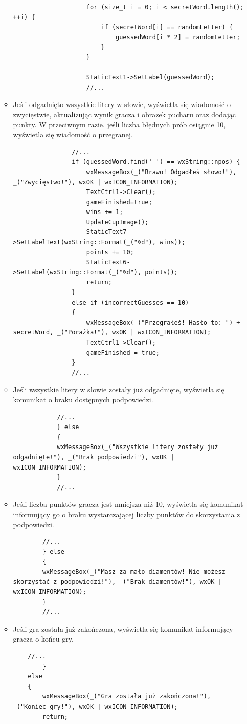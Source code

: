 \documentclass[]{report}
\begin{document}
\begin{itemize}
\begin{itemize}
\begin{lstlisting}
					for (size_t i = 0; i < secretWord.length(); ++i) {
						if (secretWord[i] == randomLetter) {
							guessedWord[i * 2] = randomLetter;
						}
					}
					
					StaticText1->SetLabel(guessedWord);
					//...
			\end{lstlisting}
			\item Jeśli odgadnięto wszystkie litery w słowie, wyświetla się wiadomość o zwycięstwie, aktualizując wynik gracza i obrazek pucharu oraz dodając punkty. W przeciwnym razie, jeśli liczba błędnych prób osiągnie 10, wyświetla się wiadomość o przegranej.
			\begin{lstlisting}
				//...
				if (guessedWord.find('_') == wxString::npos) {
					wxMessageBox(_("Brawo! Odgadłeś słowo!"), _("Zwycięstwo!"), wxOK | wxICON_INFORMATION);
					TextCtrl1->Clear();
					gameFinished=true;
					wins += 1;
					UpdateCupImage();
					StaticText7->SetLabelText(wxString::Format(_("%d"), wins));
					points += 10;
					StaticText6->SetLabel(wxString::Format(_("%d"), points));
					return;
				}
				else if (incorrectGuesses == 10)
				{
					wxMessageBox(_("Przegrałeś! Hasło to: ") + secretWord, _("Porażka!"), wxOK | wxICON_INFORMATION);
					TextCtrl1->Clear();
					gameFinished = true;
				}
				//...
			\end{lstlisting}
			\item Jeśli wszystkie litery w słowie zostały już odgadnięte, wyświetla się komunikat o braku dostępnych podpowiedzi.
			\begin{lstlisting}
			//...
			} else
			{
			wxMessageBox(_("Wszystkie litery zostały już odgadnięte!"), _("Brak podpowiedzi"), wxOK | wxICON_INFORMATION);
			}
			//...
			\end{lstlisting}
			\item Jeśli liczba punktów gracza jest mniejsza niż 10, wyświetla się komunikat informujący go o braku wystarczającej liczby punktów do skorzystania z podpowiedzi.
			\begin{lstlisting}
		//...
		} else
		{
		wxMessageBox(_("Masz za mało diamentów! Nie możesz skorzystać z podpowiedzi!"), _("Brak diamentów!"), wxOK | wxICON_INFORMATION);
		}
		//...
			\end{lstlisting}
			\item Jeśli gra została już zakończona, wyświetla się komunikat informujący gracza o końcu gry.
			\begin{lstlisting}
	//...
		}
	else
	{
		wxMessageBox(_("Gra została już zakończona!"), _("Koniec gry!"), wxOK | wxICON_INFORMATION);
		return;

\end{lstlisting}
\end{itemize}
\end{itemize}
\end{document}
